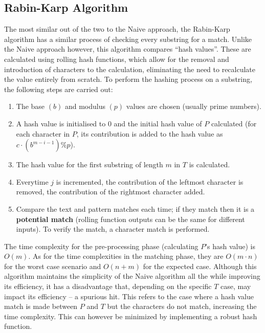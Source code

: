\documentclass[12pt]{article}
\begin{document}
\subsection{Rabin-Karp Algorithm}

\parencite{10} The most similar out of the two to the Naive approach, the Rabin-Karp algorithm
has a similar process of checking every substring for a match. Unlike the Naive approach
however, this algorithm compares “hash values”. These are calculated using rolling hash
functions, which allow for the removal and introduction of characters to the calculation,
eliminating the need to recalculate the value entirely from scratch. To perform the hashing
process on a substring, the following steps are carried out:

\begin{question}
\begin{enumerate}
	\item The base $(b)$ and modulus $(p)$ values are chosen (usually prime numbers).
	\item A hash value is initialised to 0 and the initial hash value of $P$ calculated (for each character in $P$, its contribution is added to the hash value as $c \cdot (b^{m-i-1}) \% p$).
	\item The hash value for the first substring of length $m$ in $T$ is calculated.
	\item Everytime $j$ is incremented, the contribution of the leftmost character is removed, the contribution of the rightmost character added.
	\item Compare the text and pattern matches each time; if they match then it is a \textbf{potential match} (rolling function outputs can be the same for different inputs). To verify the match, a character match is performed.
	
\end{enumerate}
\end{question}

The time complexity for the pre-processing phase (calculating $P$'s hash value) is $O(m)$.
As for the time complexities in the matching phase, they are $O(m \cdot n)$ for the worst case
scenario and $O(n + m)$ for the expected case. Although this algorithm maintains the
simplicity of the Naive algorithm all the while improving its efficiency, it has a disadvantage that, depending on the specific $T$ case, may impact its efficiency -- a spurious
hit. This refers to the case where a hash value match is made between $P$ and $T$ but the
characters do not match, increasing the time complexity. This can however be minimized
by implementing a robust hash function.
\end{document}
